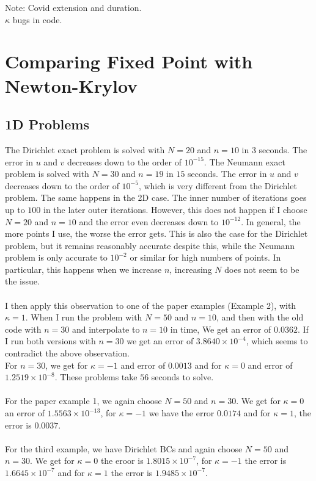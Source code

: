 \documentclass[11pt, a4paper]{article}
\theoremstyle{definition}
\begin{document}
	Note: Covid extension and duration.\\
	$\kappa$ bugs in code.
\section{Comparing Fixed Point with Newton-Krylov}
\subsection{1D Problems}
The Dirichlet exact problem is solved with $N = 20$ and $n = 10$ in $3$ seconds. The error in $u$ and $v$ decreases down to the order of $10^{-15}$.
The Neumann exact problem is solved with $N = 30$ and $n = 19$ in $15$ seconds. The error in $u$ and $v$ decreases down to the order of $10^{-5}$, which is very different from the Dirichlet problem. The same happens in the 2D case. The inner number of iterations goes up to $100$ in the later outer iterations. However, this does not happen if I choose $N = 20$ and $n = 10$ and the error even decreases down to $10^{-12}$. In general, the more points I use, the worse the error gets. This is also the case for the Dirichlet problem, but it remains reasonably accurate despite this, while the Neumann problem is only accurate to $10^{-2}$ or similar for high numbers of points. In particular, this happens when we increase $n$, increasing $N$ does not seem to be the issue.
\\
\\
I then apply this observation to one of the paper examples (Example 2), with $\kappa = 1$. When I run the problem with $N = 50$ and $n = 10$, and then with the old code with $n = 30$ and interpolate to $n = 10$ in time, We get an error of $0.0362$. If I run both versions with $n = 30$ we get an error of $3.8640 \times 10^{-4}$, which seems to contradict the above observation. \\
For $n = 30$, we get for $\kappa =-1$ and error of $0.0013$ and for $\kappa = 0$ and error of $1.2519 \times 10^{-8}$. These problems take $56$ seconds to solve.
\\
\\
For the paper example 1, we again choose $N = 50$ and $n = 30$. We get for $\kappa = 0$ an error of $1.5563 \times 10^{-13}$, for $\kappa = -1$ we have the error $0.0174$ and for $\kappa = 1$, the error is $0.0037$.
\\
\\
For the third example, we have Dirichlet BCs and again choose $N = 50$ and $n = 30$. We get for $\kappa = 0$ the eroor is $1.8015 \times 10^{-7}$, for $\kappa = -1$ the error is $1.6645 \times 10^{-7}$ and for $\kappa  =1$ the error is $1.9485 \times 10^{-7}$.
\end{document}
